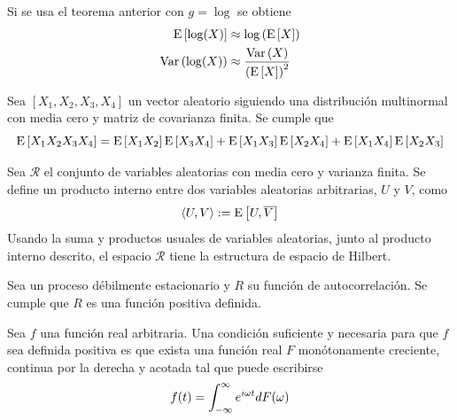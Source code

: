 \begin{corolario}
Si se usa el teorema anterior con $g = \log$ se obtiene
\begin{align}
\mathrm{E}\left[ \log(X) \right] &\approx \log\left( \mathrm{E}\left[ X \right] \right) \\
\mathrm{Var}\left( \log(X) \right) &\approx \frac{\mathrm{Var}\left( X \right)}{\left( \mathrm{E}\left[ X \right] \right)^{2}}
\end{align}
\end{corolario}

\begin{teorema}[Isserlis]
Sea $[X_1, X_2, X_3, X_4]$ un vector aleatorio siguiendo una distribución multinormal con media cero y matriz de covarianza finita. Se cumple que
\begin{equation}
\mathrm{E}\left[ X_1 X_2 X_3 X_4 \right] = \mathrm{E}\left[ X_1 X_2 \right] \mathrm{E}\left[ X_3 X_4 \right] + \mathrm{E}\left[ X_1 X_3 \right] \mathrm{E}\left[ X_2 X_4 \right] + \mathrm{E}\left[ X_1 X_4 \right] \mathrm{E}\left[ X_2 X_3 \right]
\end{equation}
\label{teo:isserlis}
\end{teorema}

%

\begin{proposicion}
Sea $\mathcal{R}$ el conjunto de variables aleatorias con media cero y varianza finita. Se define un producto interno entre dos variables aleatorias arbitrarias, $U$ y $V$, como
\begin{equation}
\langle U , V \rangle := \mathrm{E}\left[ U, \overline{V} \right]
\end{equation}
Usando la suma y productos usuales de variables aleatorias, junto al producto interno descrito, el espacio $\mathcal{R}$ tiene la estructura de espacio de Hilbert.
\end{proposicion}

\begin{proposicion}
Sea \xt un proceso débilmente estacionario y $R$ su función de autocorrelación. Se cumple que $R$ es una función positiva definida.
\end{proposicion}

\begin{teorema}[Bochner]
Sea $f$ una función real arbitraria. Una condición suficiente y necesaria para que $f$ sea definida positiva es que exista una función real $F$ monótonamente creciente, continua por la derecha y acotada tal que puede escribirse
\begin{equation}
f(t) = \int_{-\infty}^{\infty} e^{i \omega t} dF(\omega)
\end{equation}
\end{teorema}

